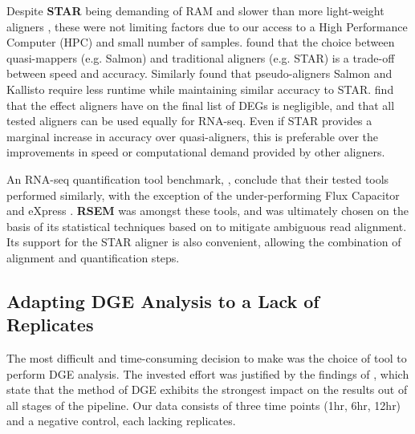Despite \textbf{STAR} being demanding of RAM \citep{Dobin2013} and slower than more light-weight aligners \citep{srivastava2020alignment}, these were not limiting factors due to our access to a High Performance Computer (HPC) and small number of samples. \cite{srivastava2020alignment} found that the choice between quasi-mappers (e.g. Salmon) and traditional aligners (e.g. STAR) is a trade-off between speed and accuracy. Similarly \cite{Zhang2017} found that pseudo-aligners Salmon and Kallisto require less runtime while maintaining similar accuracy to STAR. \cite{Schaarschmidt2020} find that the effect aligners have on the final list of \ac{DEG}s is negligible, and that all tested aligners can be used equally for RNA-seq. Even if STAR provides a marginal increase in accuracy over quasi-aligners, this is preferable over the improvements in speed or computational demand provided by other aligners.

An RNA-seq quantification tool benchmark, \cite{teng2016benchmark}, conclude that their tested tools performed similarly, with the exception of the under-performing Flux Capacitor \citep{} and eXpress \citep{}. \textbf{RSEM} was amongst these tools, and was ultimately chosen on the basis of its statistical techniques based on \cite{li2010rna} to mitigate ambiguous read alignment. Its support for the STAR aligner is also convenient, allowing the combination of alignment and quantification steps. 


\subsection{Adapting DGE Analysis to a Lack of Replicates}
\label{DGE no replicates}

The most difficult and time-consuming decision to make was the choice of tool to perform \ac{DGE} analysis. The invested effort was justified by the findings of \cite{williams2017empirical}, which state that the method of \ac{DGE} exhibits the strongest impact on the results out of all stages of the pipeline. Our data consists of three time points (1hr, 6hr, 12hr) and a negative control, each lacking replicates. 

